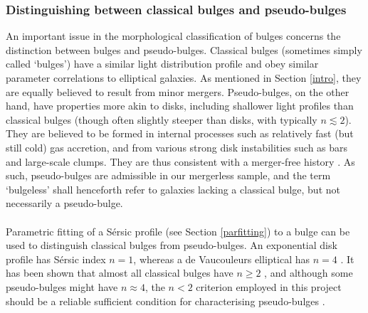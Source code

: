 \documentclass[11pt,twocolumn]{article}
\begin{document}
 \subsubsection{\normalsize Distinguishing between classical bulges and pseudo-bulges}\label{pseudo-bulge}
An important issue in the morphological classification of bulges concerns the distinction between bulges and pseudo-bulges. Classical bulges (sometimes simply called `bulges') have a similar light distribution profile and obey similar parameter correlations to elliptical galaxies. As mentioned in Section \ref{intro}, they are equally believed to result from minor mergers. Pseudo-bulges, on the other hand, have properties more akin to disks, including shallower light profiles than classical bulges (though often slightly steeper than disks, with typically $n \lesssim 2$). They are believed to be formed in internal processes such as relatively fast (but still cold) gas accretion, and from various strong disk instabilities such as bars and large-scale clumps. They are thus consistent with a merger-free history \cite{doi:10.1146/annurev-astro-082708-101811} \cite{2004ARA&A..42..603K}.  As such, pseudo-bulges are admissible in our mergerless sample, and the term `bulgeless' shall henceforth refer to galaxies lacking a classical bulge, but not necessarily a pseudo-bulge. 
\paragraph{} Parametric fitting of a S\'{e}rsic profile (see Section \ref{parfitting}) to a bulge can be used to distinguish classical bulges from pseudo-bulges. An exponential disk profile has S\'{e}rsic index $n=1$, whereas a de Vaucouleurs elliptical has $n=4$ \cite{Peng:2002ua}. It has been shown that almost all classical bulges have $n \geq 2$ \cite{2010ApJ...716..942F}, and although some pseudo-bulges might have $n \approx 4$, the $n<2$ criterion employed in this project  should be a reliable sufficient condition for characterising pseudo-bulges \cite{doi:10.1146/annurev-astro-082708-101811}. 

\end{document}

